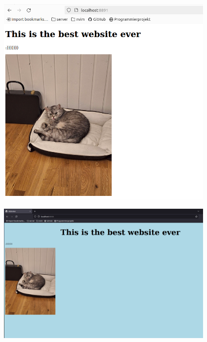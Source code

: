 \documentclass[aspectratio=169]{beamer}
\begin{document}
\begin{frame}[c]{}
  \centering
\includegraphics[width=0.8\textwidth,height=\textheight,keepaspectratio]{03_html_mit_bild.png}
\end{frame}

\begin{frame}[c]{}
  \centering
\includegraphics[width=0.8\textwidth,height=\textheight,keepaspectratio]{04_somecss.png}
\end{frame}
\end{document}
